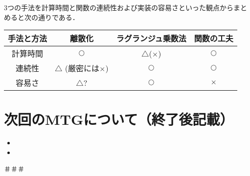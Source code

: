 \documentclass[16pt]{jsarticle}
\begin{document}
		3つの手法を計算時間と関数の連続性および実装の容易さといった観点からまとめると次の通りである．
		\begin{table}[!h]
			\centering
			\begin{tabular}{|c|c|c|c|} \hline
				 手法と方法&離散化&ラグランジュ乗数法&関数の工夫 \\ \hline
				 計算時間&$ \bigcirc $&$ \bigtriangleup	 $($\times$) &$ \bigcirc $ \\ \hline
				 連続性&$ \bigtriangleup$ (厳密には$\times$)&$ \bigcirc $&$ \bigcirc $\\ \hline
				 容易さ&$ \bigtriangleup$? &$ \bigcirc $&$ \times $\\ \hline
			\end{tabular}
		\end{table}
		
		
	\section{次回のMTGについて（終了後記載）}
	\begin{itemize}
		\item  
		\item 
	\end{itemize}
	＃＃＃
	\newpage
	

\end{document}
